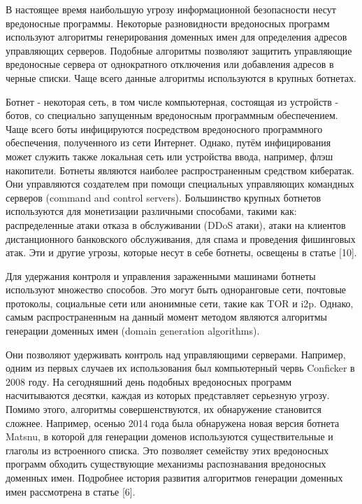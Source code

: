 
В настоящее время наибольшую угрозу информационной безопасности несут вредоносные программы. Некоторые разновидности вредоносных программ используют алгоритмы генерирования доменных имен для определения адресов управляющих серверов. Подобные алгоритмы позволяют защитить управляющие вредоносные сервера от однократного отключения или добавления адресов в черные списки. Чаще всего данные алгоритмы используются в крупных ботнетах. 

Ботнет - некоторая сеть, в том числе компьютерная, состоящая из устройств - ботов, со специально запущенным вредоносным программным обеспечением. Чаще всего боты инфицируются посредством вредоносного программного обеспечения, полученного из сети Интернет. Однако, путём инфицирования может служить также локальная сеть или устройства ввода, например, флэш накопители. Ботнеты являются наиболее распространенным средством кибератак. Они управляются создателем при помощи специальных управляющих командных серверов (command and control servers). Большинство крупных ботнетов используются для монетизации различными способами, такими как: распределенные атаки отказа в обслуживании (DDoS атаки), атаки на клиентов дистанционного банковского обслуживания, для спама и проведения фишинговых атак. Эти и другие угрозы, которые несут в себе ботнеты, освещены в статье [10].

Для удержания контроля и управления зараженными машинами ботнеты используют множество способов. Это могут быть одноранговые сети, почтовые протоколы, социальные сети или анонимные сети, такие как TOR и i2p.
Однако, самым распространенным на данный момент методом являются алгоритмы генерации доменных имен (domain generation algorithms).

Они позволяют удерживать контроль над управляющими серверами. Например, одним из первых случаев их использования был компьютерный червь Conficker в 2008 году. На сегодняшний день подобных вредоносных программ насчитываются десятки, каждая из которых представляет серьезную угрозу. Помимо этого, алгоритмы совершенствуются, их обнаружение становится сложнее. Например, осенью 2014 года была обнаружена новая версия ботнета Matsnu, в которой для генерации доменов используются существительные и глаголы из встроенного списка. Это позволяет семейству этих вредоносных программ обходить существующие механизмы распознавания вредоносных доменных имен. Подробнее история развития алгоритмов генерации доменных имен рассмотрена в статье [6].


